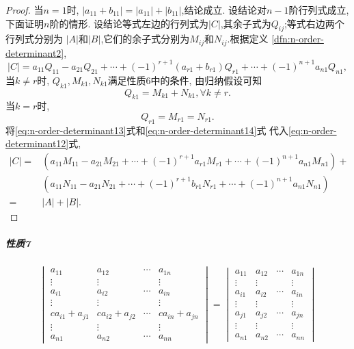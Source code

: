 \begin{proof}
  当$n=1$时, $|a_{11}+b_{11}|=|a_{11}|+|b_{11}|$,结论成立.
  设结论对$n-1$阶行列式成立,下面证明$n$阶的情形.
  设结论等式左边的行列式为$|C|$,其余子式为$Q_{ij}$;等式右边两个行列式分别为
  $|A|$和$|B|$,它们的余子式分别为$M_{ij}$和$N_{ij}$.根据定义
  \ref{dfn:n-order-determinant2},
  \begin{equation}\label{eq:n-order-determinant12}
    |C|=a_{11}Q_{11}-a_{21}Q_{21}+\cdots+(-1)^{r+1}(a_{r1}+b_{r1})Q_{r1}
    +\cdots+(-1)^{n+1}a_{n1}Q_{n1},
  \end{equation}
  当$k\neq r$时, $Q_{k1}, M_{k1},N_{k1}$满足性质6中的条件,
  由归纳假设可知
  \begin{equation}\label{eq:n-order-determinant13}
    Q_{k1}=M_{k1}+N_{k1}, \forall k\neq r.
  \end{equation}
  当$k=r$时,
  \begin{equation}\label{eq:n-order-determinant14}
    Q_{r1}=M_{r1}=N_{r1}.
  \end{equation}
  将\eqref{eq:n-order-determinant13}式和\eqref{eq:n-order-determinant14}式
  代入\eqref{eq:n-order-determinant12}式,
  \begin{align*}
    |C|= & (a_{11}M_{11}-a_{21}M_{21}+\cdots+(-1)^{r+1}a_{r1}M_{r1}+\cdots+
    (-1)^{n+1}a_{n1}M_{n1})+\\
    & (a_{11}N_{11}-a_{21}N_{21}+\cdots+(-1)^{r+1}b_{r1}N_{r1}+\cdots+
      (-1)^{n+1}a_{n1}N_{n1})\\
    = & |A|+|B|.
  \end{align*}
\end{proof}

\subparagraph{\color{ecolor}性质7}

\[
  \begin{vmatrix}
    a_{11}&a_{12}&\cdots&a_{1n}\\
    \vdots&\vdots&&\vdots\\
    a_{i1}&a_{i2}&\cdots&a_{in}\\
    \vdots&\vdots&&\vdots\\
    ca_{i1}+a_{j1}&ca_{i2}+a_{j2}&\cdots&ca_{in}+a_{jn}\\
    \vdots&\vdots&&\vdots\\
    a_{n1}&a_{n2}&\cdots&a_{nn}
  \end{vmatrix} =
  \begin{vmatrix}
    a_{11}&a_{12}&\cdots&a_{1n}\\
    \vdots&\vdots&&\vdots\\
    a_{i1}&a_{i2}&\cdots&a_{in}\\
    \vdots&\vdots&&\vdots\\
    a_{j1}&a_{j2}&\cdots&a_{jn}\\
    \vdots&\vdots&&\vdots\\    
    a_{n1}&a_{n2}&\cdots&a_{nn}
  \end{vmatrix}
\]

